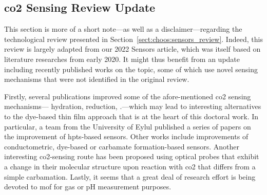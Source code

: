 \subsection{\texorpdfstring{\gls{co2}}{CO2} Sensing Review Update}

This section is more of a short note---as well as a disclaimer---regarding the technological review presented in Section~\ref{sect:choos:sensors_review}. Indeed, this review is largely adapted from our 2022 Sensors article\cite{dervieux2022}, which was itself based on literature researches from early 2020. It might thus benefit from an update including recently published works on the topic, some of which use novel sensing mechanisms that were not identified in the original review.

Firstly, several publications improved some of the afore-mentioned \gls{co2} sensing mechanisms---\ie{} hydration, reduction, \etc.---which may lead to interesting alternatives to the dye-based thin film approach that is at the heart of this doctoral work. In particular, a team from the University of Eylul published a series of papers on the improvement of \gls{hpts}-based sensors\cite{ongun2021, ongun2023a, oguzlar2023b, yilmaz2024}. Other works include improvements of conductometric\cite{kotbi2022, rath2024}, dye-based\cite{shahid2022, zhang2023atu} or carbamate formation-based\cite{lee2022tur, choi2024} sensors. Another interesting \gls{co2}-sensing route has been proposed using optical probes that exhibit a change in their molecular structure upon reaction with \gls{co2} that differs from a simple carbamation\cite{green2022, zhu2024}. Lastly, it seems that a great deal of research effort is being devoted to \gls{mof} for gas or pH measurement purposes\cite{zhang2023lum, mohammedameen2024}.

